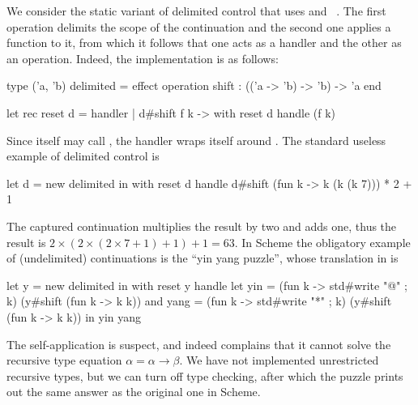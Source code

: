 We consider the static variant of delimited control that uses  and ~\cite{danvy92representing}. The first operation delimits the scope of the continuation and the second one applies a function to it, from which it follows that one acts as a handler and the other as an operation. Indeed, the \eff implementation is as follows:
%
\begin{source}
type ('a, 'b) delimited =
effect
  operation shift : (('a -> 'b) -> 'b) -> 'a
end

let rec reset d = handler
  | d#shift f k -> with reset d handle (f k)
\end{source}
%
Since  itself may call , the handler wraps itself around .
%
The standard useless example of delimited control is
%
\begin{source}
let d = new delimited in
with reset d handle
  d#shift (fun k -> k (k (k 7))) * 2 + 1
\end{source}
%
The captured continuation  multiplies the result by two and adds one, thus the
result is $2 \times (2 \times (2 \times 7 + 1) + 1) + 1 = 63$. In Scheme the obligatory example of (undelimited) continuations is the ``yin yang puzzle'', whose translation in \eff is
%
\begin{source}
let y = new delimited in
with reset y handle
  let yin  =
    (fun k -> std#write "@" ; k) (y#shift (fun k -> k k))
  and yang =
    (fun k -> std#write "*" ; k) (y#shift (fun k -> k k))
  in
    yin yang
\end{source}
%
The self-application  is suspect, and \eff indeed complains that it cannot solve the recursive type equation $\alpha = \alpha \to \beta$. We have not implemented unrestricted recursive types, but we can turn off type checking, after which the puzzle
prints out the same answer as the original one in Scheme.

